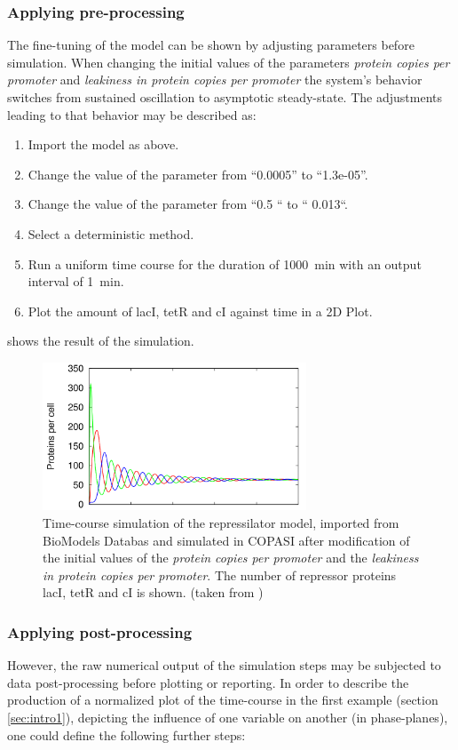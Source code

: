 \subsubsection{Applying pre-processing}
The fine-tuning of the model can be shown by adjusting parameters before simulation. When changing the initial values of the parameters \emph{protein copies per promoter} and \emph{leakiness in protein copies per promoter} the system's behavior switches from sustained oscillation to asymptotic steady-state. The adjustments leading to that behavior may be described as: 
\begin{enumerate}
\item{Import the model as above.}
\item{Change the value of the parameter  from “0.0005” to “1.3e-05”. }
\item{Change the value of the parameter  from “0.5 “ to “ 0.013“.}
\item{Select a deterministic method.}
\item{Run a uniform time course for the duration of 1000~min with an output interval of 1~min.}
\item Plot the amount of lacI, tetR and cI against time in a 2D Plot.
\end{enumerate}
 shows the result of the simulation.
%
\begin{figure}
\centering
\includegraphics[width=0.7\textwidth]{images/simEx3.png}
\caption{Time-course simulation of the repressilator model, imported from BioModels Databas and simulated in COPASI after modification of the initial values of the \emph{protein copies per promoter} and the \emph{leakiness in protein copies per promoter}. The number of repressor proteins lacI, tetR and cI is shown. (taken from \citep{Waltemath:2010})}
\label{fig:simEx3}
\end{figure}


\subsubsection{Applying post-processing}
However, the raw numerical output of the simulation steps may be subjected to data post-processing before plotting or reporting.  In order to describe the production of a normalized plot of the time-course in the first example (section \ref{sec:intro1}), depicting the influence of one variable on another (in phase-planes), one could define the following further steps:

